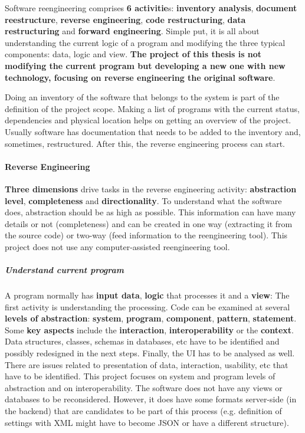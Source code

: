 Software reengineering comprises \textbf{6 activitie}s: \textbf{inventory analysis}, \textbf{document reestructure}, \textbf{reverse engineering}, \textbf{code restructuring}, \textbf{data restructuring} and \textbf{forward engineering}.
Simple put, it is all about understanding the current logic of a program and modifying the three typical components: data, logic and view.
\textbf{The project of this thesis is not modifying the current program but developing a new one with new technology, focusing on reverse engineering the original software}.

Doing an inventory of the software that belongs to the system is part of the definition of the project scope.
Making a list of programs with the current status, dependencies and physical location helps on getting an overview of the project.
Usually software has documentation that needs to be added to the inventory and, sometimes, restructured.
After this, the reverse engineering process can start.

\paragraph{Reverse Engineering}
\textbf{Three dimensions} drive tasks in the reverse engineering activity: \textbf{abstraction level}, \textbf{completeness} and \textbf{directionality}.
To understand what the software does, abstraction should be as high as possible.
This information can have many details or not (completeness) and can be created in one way (extracting it from the source code) or two-way (feed information to the reengineering tool).
This project does not use any computer-assisted reengineering tool.

\subparagraph{Understand current program}
A program normally has \textbf{input data}, \textbf{logic} that processes it and a \textbf{view}:
The first activity is understanding the processing.
Code can be examined at several \textbf{levels of abstraction}: \textbf{system}, \textbf{program}, \textbf{component}, \textbf{pattern}, \textbf{statement}.
Some \textbf{key aspects} include the \textbf{interaction}, \textbf{interoperability} or the \textbf{context}.
Data structures, classes, schemas in databases, etc have to be identified and possibly redesigned in the next steps.
Finally, the \ac{UI} has to be analysed as well. 
There are issues related to presentation of data, interaction, usability, etc that have to be identified.
This project focuses on system and program levels of abstraction and on interoperability.
The software does not have any views or databases to be reconsidered.
However, it does have some formats server-side (in the backend) that are candidates to be part of this process (e.g. definition of settings with \ac{XML} might have to become \ac{JSON} or have a different structure).

